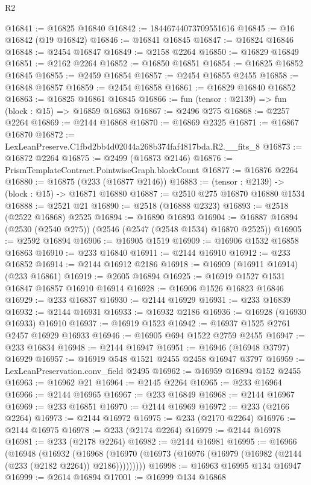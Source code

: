 \begin{lexlean}{R2}
\begin{coremodule}
@16841 := @16825 @16840
@16842 := 18446744073709551616
@16845 := @16 @16842 (@19 @16842)
@16846 := @16841 @16845
@16847 := @16824 @16846
@16848 := @2454 @16847
@16849 := @2158 @2264
@16850 := @16829 @16849
@16851 := @2162 @2264
@16852 := @16850 @16851
@16854 := @16825 @16852 @16845
@16855 := @2459 @16854
@16857 := @2454 @16855 @2455
@16858 := @16848 @16857
@16859 := @2454 @16858
@16861 := @16829 @16840 @16852
@16863 := @16825 @16861 @16845
@16866 := fun (tensor : @2139) => fun (block : @15) => @16859 @16863
@16867 := @2496 @275
@16868 := @2257 @2264
@16869 := @2144 @16868
@16870 := @16869 @2325
@16871 := @16867 @16870
@16872 := LexLeanPreserve.C1fbd2bb4d02044a268b374faf4817bda.R2.__fits_8
@16873 := @16872 @2264
@16875 := @2499 (@16873 @2146)
@16876 := PrismTemplateContract.PointwiseGraph.blockCount
@16877 := @16876 @2264
@16880 := @16875 (@233 (@16877 @2146))
@16883 := (tensor : @2139) -> (block : @15) -> @16871 @16880
@16887 := @2510 @275 @16870 @16880 @1534
@16888 := @2521 @21
@16890 := @2518 (@16888 @2323)
@16893 := @2518 (@2522 @16868) @2525
@16894 := @16890 @16893
@16904 := @16887 @16894 (@2530 (@2540 @275)) (@2546 (@2547 (@2548 @1534) @16870 @2525))
@16905 := @2592 @16894
@16906 := @16905 @1519
@16909 := @16906 @1532 @16858 @16863
@16910 := @233 @16840
@16911 := @2144 @16910
@16912 := @233 @16852
@16914 := @2144 @16912 @2186
@16918 := @16909 (@16911 @16914) (@233 @16861)
@16919 := @2605 @16894
@16925 := @16919 @1527 @1531 @16847 @16857 @16910 @16914
@16928 := @16906 @1526 @16823 @16846
@16929 := @233 @16837
@16930 := @2144 @16929
@16931 := @233 @16839
@16932 := @2144 @16931
@16933 := @16932 @2186
@16936 := @16928 (@16930 @16933) @16910
@16937 := @16919 @1523
@16942 := @16937 @1525 @2761 @2457 @16929 @16933
@16946 := @16905 @694 @1522 @2759 @2455
@16947 := @233 @16834
@16948 := @2144 @16947
@16951 := @16946 (@16948 @3797) @16929
@16957 := @16919 @548 @1521 @2455 @2458 @16947 @3797
@16959 := LexLeanPreservation.conv_field @2495
@16962 := @16959 @16894 @152 @2455
@16963 := @16962 @21
@16964 := @2145 @2264
@16965 := @233 @16964
@16966 := @2144 @16965
@16967 := @233 @16849
@16968 := @2144 @16967
@16969 := @233 @16851
@16970 := @2144 @16969
@16972 := @233 (@2166 @2264)
@16973 := @2144 @16972
@16975 := @233 (@2170 @2264)
@16976 := @2144 @16975
@16978 := @233 (@2174 @2264)
@16979 := @2144 @16978
@16981 := @233 (@2178 @2264)
@16982 := @2144 @16981
@16995 := @16966
    (@16948
      (@16932
        (@16968 (@16970 (@16973 (@16976 (@16979 (@16982 (@2144 (@233 (@2182 @2264)) @2186)))))))))
@16998 := @16963 @16995 @134 @16947
@16999 := @2614 @16894
@17001 := @16999 @134 @16868

\end{coremodule}
\end{lexlean}
